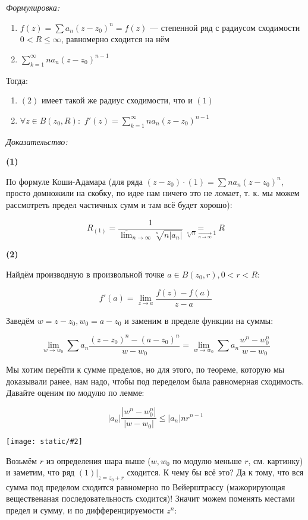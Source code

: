 \documentclass{article}
\def\dbl{\,\,}
\def\images#1#2{\begin{center}\texttt{[image: static/\#2]}\end{center}}
\begin{document}
\textit{Формулировка:}

\begin{enumerate}
    \item $f(z) = \sum a_n (z - z_0)^n = f(z)$ --- степенной ряд с радиусом сходимости $0 < R \le \infty$, равномерно сходится на нём
    \item $\sum_{k = 1}^\infty na_n(z - z_0)^{n - 1}$
\end{enumerate}

Тогда:

\begin{enumerate}
    \item $(2)$ имеет такой же радиус сходимости, что и $(1)$
    \item $\forall z \in B(z_0, R): \dbl f'(z) = \sum_{k = 1}^\infty na_n(z - z_0)^{n - 1}$
\end{enumerate}

\textit{Доказательство:}

\textbf{(1)}

По формуле Коши-Адамара (для ряда $(z - z_0) \cdot (1) = \sum na_n(z - z_0)^n$, просто домножили на скобку, по идее нам ничего это не ломает, т. к. мы можем рассмотреть предел частичных сумм и там всё будет хорошо): 

\[R_{(1)} = \frac{1}{\overline{\lim}_{n \rightarrow \infty} \sqrt[n]{n|a_n|}} \underset{\sqrt[n]{n} \underset{n \rightarrow \infty}{\longrightarrow} 1}{=} R\]

\textbf{(2)}

Найдём производную в произвольной точке $a \in B(z_0, r), 0 < r < R$: 

\[f'(a) = \lim_{z \rightarrow a} \frac{f(z) - f(a)}{z - a}\]

Заведём $w = z - z_0, w_0 = a - z_0$ и заменим в пределе функции на суммы: 

\[\lim_{w \rightarrow w_0} \sum a_n \frac{(z - z_0)^n - (a - z_0)^n}{w - w_0} = \lim_{w \rightarrow w_0} \sum a_n \frac{w^n - w^n_0}{w - w_0}\]

Мы хотим перейти к сумме пределов, но для этого, по теореме, которую мы доказывали ранее, нам надо, чтобы под переделом была равномерная сходимость. Давайте оценим по модулю по лемме: 

\[|a_n|\frac{|w^n - w^n_0|}{|w - w_0|} \le |a_n|nr^{n - 1}\]

\images{0.3}{st_r_diff.png}

Возьмём $r$ из определения шара выше ($w, w_0$ по модулю меньше $r$, см. картинку) и заметим, что ряд $(1)|_{z = z_0 + r}$ сходится. К чему бы всё это? Да к тому, что вся сумма под пределом сходится равномерно по Вейерштрассу (мажорирующая вещественаная последовательность сходится)! Значит можем поменять местами предел и сумму, и по дифференцируемости $z^n$:
\end{document}
